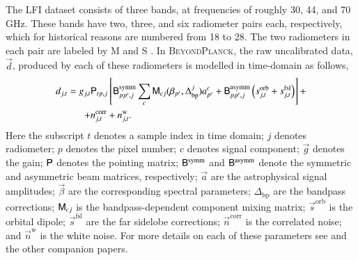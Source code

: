 \documentclass[twocolumn]{aa}
\renewcommand{\d}[0]{\vec{d}}
\newcommand{\n}[0]{\vec{n}}
\newcommand{\s}[0]{\vec{s}}
\renewcommand{\a}[0]{\vec{a}}
\newcommand{\B}[0]{\tens{B}}
\newcommand{\g}[0]{\vec{g}}
\newcommand{\M}[0]{\tens{M}}
\renewcommand{\P}[0]{\tens{P}}
\newcommand{\BP}{\textsc{BeyondPlanck}}
\begin{document}
The LFI dataset consists of three bands, at frequencies of
roughly 30, 44, and 70\,GHz. These bands have two, three, and six radiometer
pairs each, respectively, which for historical reasons are numbered
from 18 to 28. The two radiometers in each pair are labeled by M and S
\citep{planck2013-p02}. In \BP, the raw uncalibrated data, $\d$, produced by
each of these radiometers is modelled in time-domain as follows,
\begin{equation}
	\begin{split}
		d_{j,t} = g_{j,t}&\P_{tp,j}\left[\B^{\mathrm{symm}}_{pp',j}\sum_{c}
		\M_{cj}(\beta_{p'}, \Delta_\mathrm{bp}^{j})a^c_{p'}  + \B^{\mathrm{asymm}}_{pp',j}\left(s^{\mathrm{orb}}_{j,t}  
		+ s^{\mathrm{fsl}}_{j,t}\right)\right] + \\
		+ &n^{\mathrm{corr}}_{j,t} + n^{\mathrm{w}}_{j,t}.
	\end{split}
	\label{eq:todmodel}
\end{equation}
Here the subscript $t$ denotes a sample index in time domain; $j$ denotes
radiometer; $p$ denotes the pixel number; $c$ denotes signal component; $\g$
denotes the gain; $\P$ denotes the pointing matrix; $\B^{\mathrm{symm}}$ and
$\B^{\mathrm{asymm}}$ denote the symmetric and asymmetric beam matrices,
respectively; $\a$ are the astrophysical signal amplitudes; $\vec{\beta}$ are
the corresponding spectral parameters; $\Delta_\mathrm{bp}$ are the bandpass
corrections; $\M_{cj}$ is the bandpass-dependent component mixing matrix;
$\s^{\mathrm{orb}}$ is the orbital dipole; $\s^{\mathrm{fsl}}$ are the far
sidelobe corrections; $\n^{\mathrm{corr}}$ is the correlated noise; and
$\n^{\mathrm{w}}$ is the white noise. For more details on each of these
parameters see \citet{bp01} and the other companion papers. 
\end{document}
